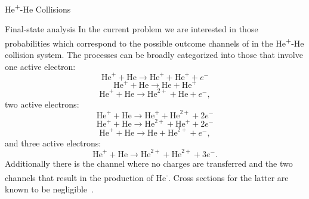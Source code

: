 \documentclass[letterpaper, 11 pt]{report}
\begin{document}
\begin{chapter}{\texorpdfstring{He\textsuperscript{+}}{He+}-He Collisions \label{chap:hephe}}
\begin{subsection}{Final-state analysis \label{sec:hephe-det}}
      In the current problem we are interested in those probabilities which correspond to the possible
      outcome channels of in the He\textsuperscript{+}-He collision system. The processes can be broadly
      categorized into those that involve one active electron:
      \begin{equation} \label{eq:tpi111}
         \mathrm{He}^+ + \mathrm{He} \rightarrow \mathrm{He}^+ + \mathrm{He}^+ + e^-
      \end{equation}
      \begin{equation} \label{eq:tpi120}
         \mathrm{He}^+ + \mathrm{He} \rightarrow \mathrm{He} + \mathrm{He}^+
      \end{equation}
      \begin{equation} \label{eq:tpi201}
         \mathrm{He}^+ + \mathrm{He} \rightarrow \mathrm{He}^{2+} + \mathrm{He} + e^-,
      \end{equation}
      two active electrons:
      \begin{equation} \label{eq:tpi012}
         \mathrm{He}^+ + \mathrm{He} \rightarrow \mathrm{He}^+ + \mathrm{He}^{2+} + 2e^-
      \end{equation}
      \begin{equation} \label{eq:tpi102}
         \mathrm{He}^+ + \mathrm{He} \rightarrow \mathrm{He}^{2+} + \mathrm{He}^+ + 2e^-
      \end{equation}
      \begin{equation} \label{eq:tpi021}
         \mathrm{He}^+ + \mathrm{He} \rightarrow \mathrm{He} + \mathrm{He}^{2+} + e^-,
      \end{equation}
      and three active electrons:
      \begin{equation} \label{eq:tpi003}
         \mathrm{He}^+ + \mathrm{He} \rightarrow \mathrm{He}^{2+} + \mathrm{He}^{2+} + 3e^{-}.
      \end{equation}
      Additionally there is the channel where no charges are transferred and the two channels that result
      in the production of He\textsuperscript{-}. Cross sections for the latter are known to be
      negligible~\cite{metahe, neghe-neg}.


\end{subsection}
\end{chapter}
\end{document}
